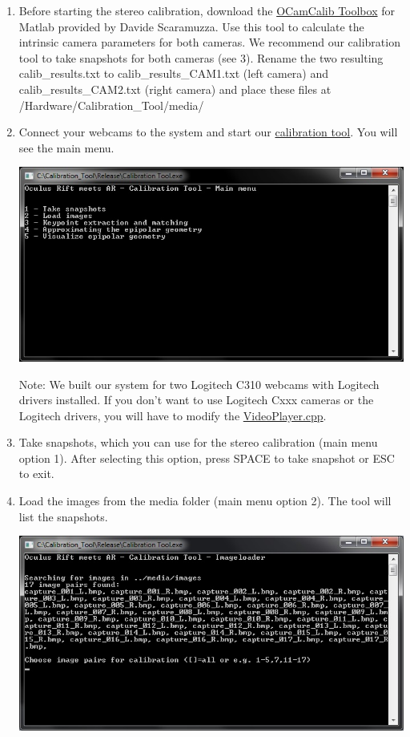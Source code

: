 \begin{enumerate}
\item 
Before starting the stereo calibration, download the \href{https://sites.google.com/site/scarabotix/ocamcalib-toolbox}{OCamCalib Toolbox} for Matlab provided by Davide Scaramuzza. Use this tool to calculate the intrinsic camera parameters for both cameras. We recommend our calibration tool to take snapshots for both cameras (see 3). Rename the two resulting calib\_results.txt to calib\_results\_CAM1.txt (left camera) and calib\_results\_CAM2.txt (right camera) and place these files at /Hardware/Calibration\_Tool/media/
\item
  Connect your webcams to the system and start our
  \href{https://github.com/ands/OculusMeetsAR/tree/master/Hardware/Calibration_Tool}{calibration
  tool}. You will see the main menu.
	
  \includegraphics*[width=.92\textwidth]{0.jpg}
	
  Note: We built our system for two Logitech C310 webcams with Logitech
  drivers installed. If you don't want to use Logitech Cxxx cameras or
  the Logitech drivers, you will have to modify the
  \href{https://github.com/ands/OculusMeetsAR/tree/master/ARLib/src/Video}{VideoPlayer.cpp}.
\item
  Take snapshots, which you can use for the stereo calibration (main
  menu option 1). After selecting this option, press SPACE to take
  snapshot or ESC to exit.
\item
  Load the images from the media folder (main menu option 2). The tool
  will list the snapshots.
	
  \includegraphics*[width=.92\textwidth]{2.jpg}
	

\end{enumerate}
